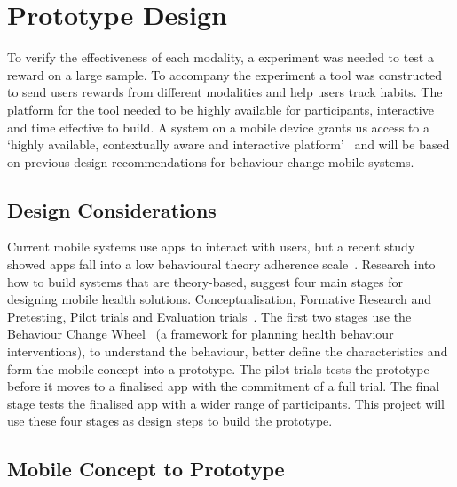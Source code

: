 
\newpage
\section{Prototype Design}

To verify the effectiveness of each modality, a experiment was needed to test a reward on a large sample.
To accompany the experiment a tool was constructed to send users rewards from different modalities and help users track habits. The platform for the tool needed to be highly available for participants, interactive and time effective to build.
A system on a mobile device grants us access to a `highly available, contextually aware and interactive platform'~\cite{article_mhealth} and will be based on previous design recommendations for behaviour change mobile systems.

\subsection{Design Considerations}

Current mobile systems use apps to interact with users, but a recent study showed apps fall into a low behavioural theory adherence scale~\cite{article_mhealth}.
Research into how to build systems that are theory-based, suggest four main stages for designing mobile health solutions. Conceptualisation, Formative Research and Pretesting,
Pilot trials and Evaluation trials~\cite{article_mhealth}. The first two stages use the Behaviour Change Wheel~\cite{article_behaviour_change_wheel}
(a framework for planning health behaviour interventions), to understand the behaviour, better define the characteristics and form the mobile concept into a prototype.
The pilot trials tests the prototype before it moves to a finalised app with the commitment of a full trial. The final stage tests the finalised app with a wider range of participants.
This project will use these four stages as design steps to build the prototype.

\subsection{Mobile Concept to Prototype}

